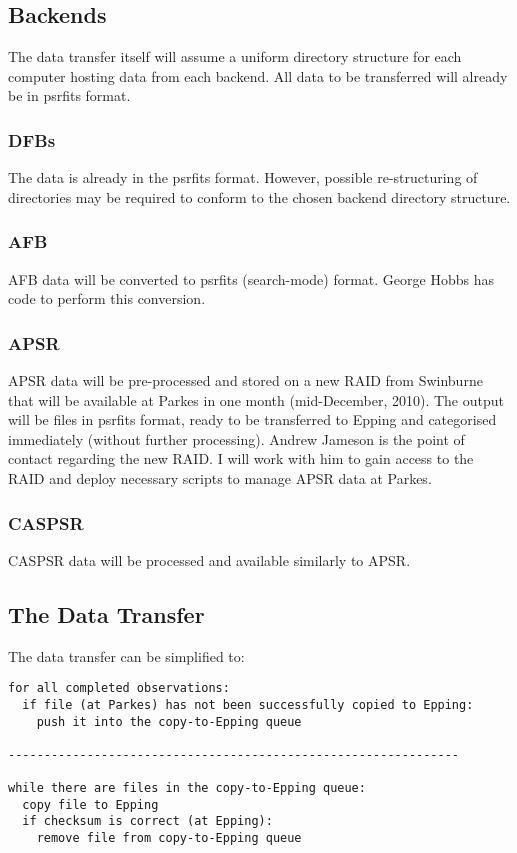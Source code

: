 \documentclass{article}
\begin{document}
\subsection{Backends}
The data transfer itself will assume a uniform directory structure for each computer hosting data from each backend. All data to be transferred will already be in psrfits format.

\subsubsection{DFBs}
The data is already in the psrfits format. However, possible re-structuring of directories may be required to conform to the chosen backend directory structure.

\subsubsection{AFB}
AFB data will be converted to psrfits (search-mode) format. George Hobbs has code to perform this conversion.

\subsubsection{APSR}
APSR data will be pre-processed and stored on a new RAID from Swinburne that will be available at Parkes in one month (mid-December, 2010). The output will be files in psrfits format, ready to be transferred to Epping and categorised immediately (without further processing). Andrew Jameson is the point of contact regarding the new RAID. I will work with him to gain access to the RAID and deploy necessary scripts to manage APSR data at Parkes.

\subsubsection{CASPSR}
CASPSR data will be processed and available similarly to APSR.

\subsection{The Data Transfer}
The data transfer can be simplified to:
\begin{verbatim}
for all completed observations: 
  if file (at Parkes) has not been successfully copied to Epping:
    push it into the copy-to-Epping queue

---------------------------------------------------------------

while there are files in the copy-to-Epping queue:
  copy file to Epping
  if checksum is correct (at Epping):
    remove file from copy-to-Epping queue
\end{verbatim}
\end{document}
